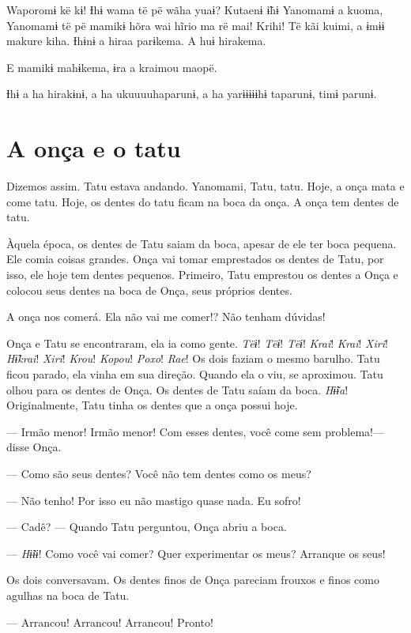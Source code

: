 Waporomɨ kë kɨ! Ɨhɨ wama të pë wãha yuaɨ? Kutaenɨ ɨ̃hɨ Yanomamɨ a kuoma,
Yanomamɨ të pë mamikɨ hõra wai hĩrio ma rë mai! Krihi! Të kãi kuimi, a
ɨmɨɨ makure kiha. Ɨhɨnɨ a hiraa parɨkema. A huɨ hirakema. 

E mamikɨ mahɨkema, ɨra a kraimou maopë. 

Ɨhɨ a ha hirakɨnɨ, a ha ukuuuuhaparunɨ, a ha yarɨɨɨɨɨhɨ taparunɨ, timɨ
parunɨ. 

\chapter{A onça e o tatu}
 
 Dizemos assim. Tatu estava andando. Yanomami, Tatu, tatu.
Hoje, a onça mata e come tatu. Hoje, os dentes do tatu ficam na boca da
onça. A onça tem dentes de tatu. 

Àquela época, os dentes de Tatu saiam da boca, apesar de ele ter boca
pequena. Ele comia coisas grandes. Onça vai tomar emprestados os dentes
de Tatu, por isso, ele hoje tem dentes pequenos. Primeiro, Tatu
emprestou os dentes a Onça e colocou seus dentes na boca de Onça, seus
próprios dentes. 

A onça nos comerá. Ela não vai me comer!? Não tenham dúvidas! 

Onça e Tatu se encontraram, ela ia como gente. \textit{Tëɨ}! \textit{Tëɨ}! \textit{Tëɨ}! \textit{Krai}!
\textit{Krai}! \textit{Xiri}! \textit{Hɨ̃krai}! \textit{Xiri}! \textit{Krou}! \textit{Kopou}! \textit{Poxo}! \textit{Rae}! Os dois faziam o mesmo
barulho. Tatu ficou parado, ela vinha em sua direção. Quando ela o viu, se
aproximou. Tatu olhou para os dentes de Onça. Os dentes de Tatu saíam da
boca. \textit{Hɨ̃ɨa}! Originalmente, Tatu tinha os dentes que a onça possui hoje. 

--- Irmão menor! Irmão menor! Com esses dentes, você come sem
problema!--- disse Onça. 

--- Como são seus dentes? Você não tem dentes como os meus?

--- Não tenho! Por isso eu não mastigo quase nada. Eu sofro! 

--- Cadê? --- Quando Tatu perguntou, Onça abriu a boca. 

--- \textit{Hɨ̃ɨɨ}! Como você vai comer? Quer experimentar os meus? Arranque
os seus! 

Os dois conversavam. Os dentes finos de Onça pareciam frouxos e finos
como agulhas na boca de Tatu.

--- Arrancou! Arrancou! Arrancou! Pronto! 

